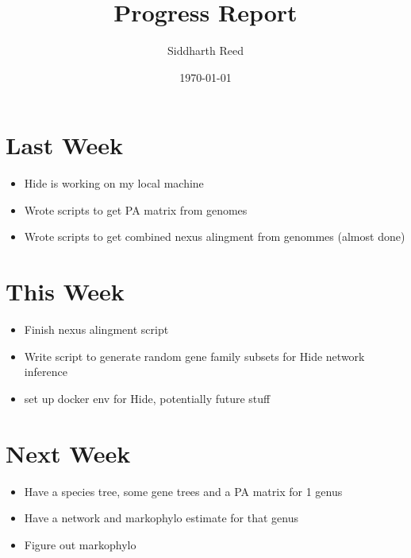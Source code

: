 \documentclass[10pt,letter]{article}
\title{Progress Report}
\author{Siddharth Reed}
\date{\today}
\begin{document}
\maketitle

\section*{Last Week}
\begin{itemize}
    \item Hide is working on my local machine
    \item Wrote scripts to get PA matrix from genomes
    \item Wrote scripts to get combined nexus alingment from genommes (almost done)
\end{itemize}

\section*{This Week}
\begin{itemize}
    \item Finish nexus alingment script
    \item Write script to generate random gene family subsets for Hide network inference
    \item set up docker env for Hide, potentially future stuff
\end{itemize}

\section*{Next Week}
\begin{itemize}
    \item Have a species tree, some gene trees and a PA matrix for 1 genus
    \item Have a network  and markophylo estimate for that genus
    \item Figure out markophylo
\end{itemize}
\end{document}
